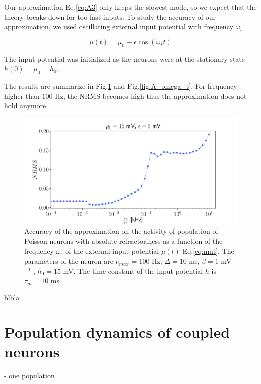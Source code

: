 \documentclass[a4paper,11pt,twoside]{article}
\numberwithin{equation}{section}
\begin{document}
Our approximation Eq.\eqref{eq:A3} only keeps the slowest mode, so we expect that the theory breaks down for too fast inputs. To study the accuracy of our approximation, we used oscillating external input potential with frequency $\omega_s$ 

\begin{equation}
\label{eq:mut}
\mu(t)=\mu_0 + \epsilon \cos(\omega_st)
\end{equation}

The input potential was initialized as the neurons were at the stationary state $h(0)=\mu_0=h_0$. 

The results are summarize in Fig.\ref{fig:NRMSo} and Fig.\ref{fig:A_omega_t}. For frequency higher than $100$ Hz, the NRMS becomes high thus the approximation does not hold anymore.




\begin{figure}[h!]
	\centering
	\includegraphics[width=0.8\linewidth]{NRMSo.pdf}
	\caption{Accuracy of the approximation on the activity of population of Poisson neurons with absolute refractoriness as a function of the frequency $\omega_s$ 
	of the external input potential $\mu(t)$ Eq.\eqref{eq:mut}. The parameters of the neuron are $\nu_{max}=100$ Hz, $\Delta=10$ ms, $\beta=1$ mV$^{-1}$ , $h_0=15$ mV. The time constant of the input potential $h$ is $\tau_m=10$ ms.
 }
	\label{fig:NRMSo}
\end{figure}


blbla \cite{GerKis14}



\chapter{Population dynamics of coupled neurons}

- one population






%
%
%

%
%

\end{document}
